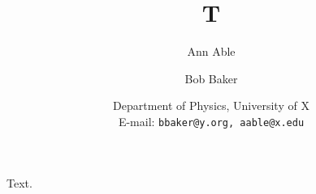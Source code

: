 \documentclass{article}
\author{Ann Able \and Bob Baker}
\title{T}
\date{Department of Physics, University of X\\ E-mail: \texttt{bbaker@y.org, aable@x.edu}}
\begin{document}
\maketitle
Text.
\end{document}
